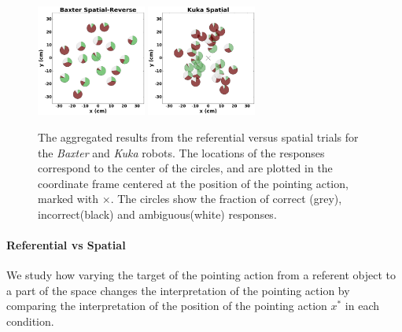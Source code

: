 \begin{figure}[t!]
    \includegraphics[width=0.32\textwidth ]{figures/baxter_Spatial-Reverse_.png}
    \includegraphics[width=0.32\textwidth ]{figures/kuka_Spatial_.png}
    \caption{The aggregated results from the referential versus spatial trials for the \textit{Baxter} and \textit{Kuka} robots. The locations of the responses correspond to the center of the circles, and are plotted in the coordinate frame centered at the position of the pointing action, marked with $\times$. The circles show the fraction of correct (grey), incorrect(black) and ambiguous(white) responses.}
    \label{fig:aggregatesimple}
\end{figure}



\paragraph{Referential vs Spatial}
We study how varying the target of the pointing action from a referent object to a part of the space changes the interpretation of the pointing action by comparing the interpretation of the position of the pointing action $x^*$ in each condition. 


